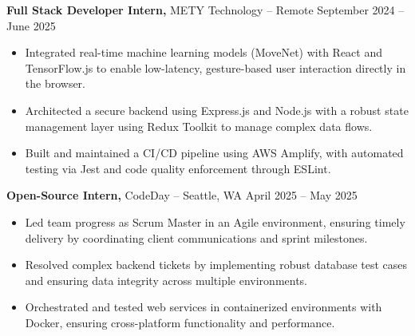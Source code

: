 \documentclass[11pt]{article}       %
\begin{document}
\textbf{Full Stack Developer Intern,} {METY Technology} -- Remote \hfill September 2024 -- June 2025 
\vspace{-9pt}
\begin{itemize}
  \item Integrated real-time machine learning models (MoveNet) with React and TensorFlow.js to enable low-latency, gesture-based user interaction directly in the browser.
  \item Architected a secure backend using Express.js and Node.js with a robust state management layer using Redux Toolkit to manage complex data flows.
  \item Built and maintained a CI/CD pipeline using AWS Amplify, with automated testing via Jest and code quality enforcement through ESLint.
\end{itemize}

\textbf{Open-Source Intern,} {CodeDay} -- Seattle, WA \hfill April 2025 -- May 2025 \\
\vspace{-9pt}
\begin{itemize}
  \item Led team progress as Scrum Master in an Agile environment, ensuring timely delivery by coordinating client communications and sprint milestones.
  \item Resolved complex backend tickets by implementing robust database test cases and ensuring data integrity across multiple environments.
  \item Orchestrated and tested web services in containerized environments with Docker, ensuring cross-platform functionality and performance.
\end{itemize}
\end{document}
